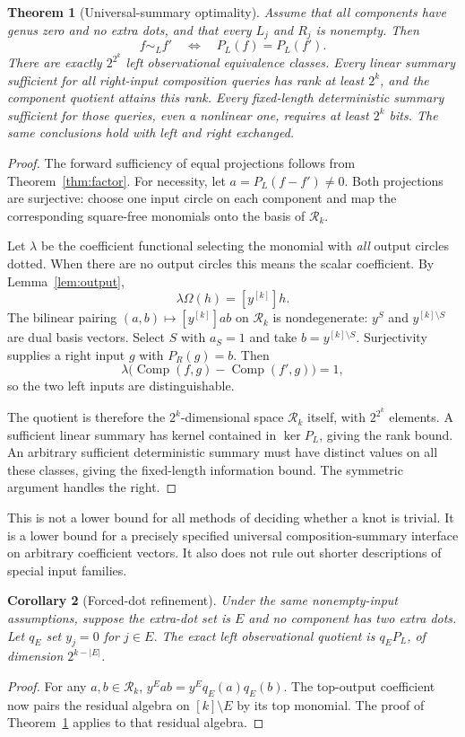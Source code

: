 \documentclass[11pt,letterpaper]{article}
\newtheorem{theorem}{Theorem}[section]
\newtheorem{corollary}[theorem]{Corollary}
\theoremstyle{definition}
\theoremstyle{remark}
\newcommand{\R}{\mathcal R}
\newcommand{\Comp}{\operatorname{Comp}}
\begin{document}
\begin{theorem}[Universal-summary optimality]
\label{thm:optimal}
Assume that all components have genus zero and no extra dots, and that
every $L_j$ and $R_j$ is nonempty. Then
\[
 f\sim_L f'\quad\Longleftrightarrow\quad P_L(f)=P_L(f').
\]
There are exactly $2^{2^k}$ left observational equivalence classes.
Every linear summary sufficient for all right-input composition queries
has rank at least $2^k$, and the component quotient attains this rank.
Every fixed-length deterministic summary sufficient for those queries,
even a nonlinear one, requires at least $2^k$ bits. The same conclusions
hold with left and right exchanged.
\end{theorem}
\begin{proof}
The forward sufficiency of equal projections follows from
Theorem~\ref{thm:factor}. For necessity, let
$a=P_L(f-f')\ne0$. Both projections are surjective: choose one input
circle on each component and map the corresponding square-free monomials
onto the basis of $\R_k$.

Let $\lambda$ be the coefficient functional selecting the monomial with
\emph{all} output circles dotted. When there are no output circles this
means the scalar coefficient. By Lemma~\ref{lem:output},
\[
 \lambda\Omega(h)=[y^{[k]}]h.
\]
The bilinear pairing $(a,b)\mapsto[y^{[k]}]ab$ on $\R_k$ is nondegenerate:
$y^S$ and $y^{[k]\setminus S}$ are dual basis vectors. Select $S$ with
$a_S=1$ and take $b=y^{[k]\setminus S}$. Surjectivity supplies a right
input $g$ with $P_R(g)=b$. Then
\[
 \lambda\bigl(\Comp(f,g)-\Comp(f',g)\bigr)=1,
\]
so the two left inputs are distinguishable.

The quotient is therefore the $2^k$-dimensional space $\R_k$ itself, with
$2^{2^k}$ elements. A sufficient linear summary has kernel contained in
$\ker P_L$, giving the rank bound. An arbitrary sufficient deterministic
summary must have distinct values on all these classes, giving the
fixed-length information bound. The symmetric argument handles the right.
\end{proof}

This is not a lower bound for all methods of deciding whether a knot is
trivial. It is a lower bound for a precisely specified universal
composition-summary interface on arbitrary coefficient vectors. It also
does not rule out shorter descriptions of special input families.

\begin{corollary}[Forced-dot refinement]
\label{cor:forced}
Under the same nonempty-input assumptions, suppose the extra-dot set is
$E$ and no component has two extra dots. Let $q_E$ set $y_j=0$ for $j\in E$.
The exact left observational quotient is $q_E P_L$, of dimension
$2^{k-|E|}$.
\end{corollary}
\begin{proof}
For any $a,b\in\R_k$,
$y^Eab=y^E q_E(a)q_E(b)$. The top-output coefficient now pairs the residual
algebra on $[k]\setminus E$ by its top monomial. The proof of
Theorem~\ref{thm:optimal} applies to that residual algebra.
\end{proof}
\end{document}

